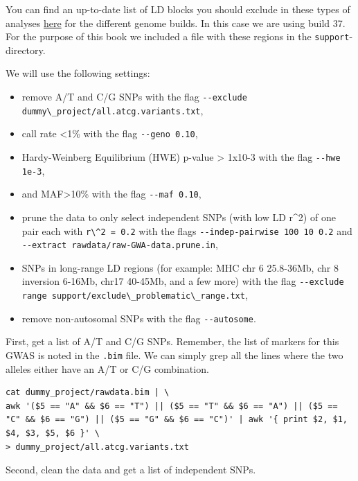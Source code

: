 \documentclass[
]{book}
\newcommand{\passthrough}[1]{#1}
\providecommand{\tightlist}{%
  \setlength{\itemsep}{0pt}\setlength{\parskip}{0pt}}
\begin{document}
You can find an up-to-date list of LD blocks you should exclude in these types of analyses \href{https://genome.sph.umich.edu/wiki/Regions_of_high_linkage_disequilibrium_(LD)}{here} for the different genome builds. In this case we are using build 37. For the purpose of this book we included a file with these regions in the \passthrough{\lstinline!support!}-directory.

We will use the following settings:

\begin{itemize}
\tightlist
\item
  remove A/T and C/G SNPs with the flag \passthrough{\lstinline!--exclude dummy\_project/all.atcg.variants.txt!},
\item
  call rate \textless1\% with the flag \passthrough{\lstinline!--geno 0.10!},
\item
  Hardy-Weinberg Equilibrium (HWE) p-value \textgreater{} 1x10-3 with the flag \passthrough{\lstinline!--hwe 1e-3!},
\item
  and MAF\textgreater10\% with the flag \passthrough{\lstinline!--maf 0.10!},
\item
  prune the data to only select independent SNPs (with low LD r\^{}2) of one pair each with \passthrough{\lstinline!r\^2 = 0.2!} with the flags \passthrough{\lstinline!--indep-pairwise 100 10 0.2!} and \passthrough{\lstinline!--extract rawdata/raw-GWA-data.prune.in!},
\item
  SNPs in long-range LD regions (for example: MHC chr 6 25.8-36Mb, chr 8 inversion 6-16Mb, chr17 40-45Mb, and a few more) with the flag \passthrough{\lstinline!--exclude range support/exclude\_problematic\_range.txt!},
\item
  remove non-autosomal SNPs with the flag \passthrough{\lstinline!--autosome!}.
\end{itemize}

First, get a list of A/T and C/G SNPs. Remember, the list of markers for this GWAS is noted in the \passthrough{\lstinline!.bim!} file. We can simply grep all the lines where the two alleles either have an A/T or C/G combination.

\begin{lstlisting}
cat dummy_project/rawdata.bim | \
awk '($5 == "A" && $6 == "T") || ($5 == "T" && $6 == "A") || ($5 == "C" && $6 == "G") || ($5 == "G" && $6 == "C")' | awk '{ print $2, $1, $4, $3, $5, $6 }' \
> dummy_project/all.atcg.variants.txt
\end{lstlisting}

Second, clean the data and get a list of independent SNPs.
\end{document}
